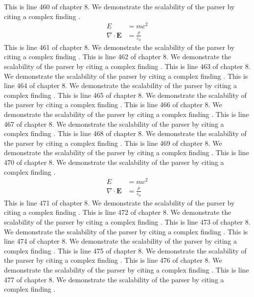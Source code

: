 This is line 460 of chapter 8. We demonstrate the scalability of the parser by citing a complex finding \cite{ref8_460}.
\begin{align*}
  E &= mc^2 \\
  \nabla \cdot \mathbf{E} &= \frac{\rho}{\varepsilon_0}
\end{align*}
This is line 461 of chapter 8. We demonstrate the scalability of the parser by citing a complex finding \cite{ref8_461}.
This is line 462 of chapter 8. We demonstrate the scalability of the parser by citing a complex finding \cite{ref8_462}.
This is line 463 of chapter 8. We demonstrate the scalability of the parser by citing a complex finding \cite{ref8_463}.
This is line 464 of chapter 8. We demonstrate the scalability of the parser by citing a complex finding \cite{ref8_464}.
This is line 465 of chapter 8. We demonstrate the scalability of the parser by citing a complex finding \cite{ref8_465}.
This is line 466 of chapter 8. We demonstrate the scalability of the parser by citing a complex finding \cite{ref8_466}.
This is line 467 of chapter 8. We demonstrate the scalability of the parser by citing a complex finding \cite{ref8_467}.
This is line 468 of chapter 8. We demonstrate the scalability of the parser by citing a complex finding \cite{ref8_468}.
This is line 469 of chapter 8. We demonstrate the scalability of the parser by citing a complex finding \cite{ref8_469}.
This is line 470 of chapter 8. We demonstrate the scalability of the parser by citing a complex finding \cite{ref8_470}.
\begin{align*}
  E &= mc^2 \\
  \nabla \cdot \mathbf{E} &= \frac{\rho}{\varepsilon_0}
\end{align*}
This is line 471 of chapter 8. We demonstrate the scalability of the parser by citing a complex finding \cite{ref8_471}.
This is line 472 of chapter 8. We demonstrate the scalability of the parser by citing a complex finding \cite{ref8_472}.
This is line 473 of chapter 8. We demonstrate the scalability of the parser by citing a complex finding \cite{ref8_473}.
This is line 474 of chapter 8. We demonstrate the scalability of the parser by citing a complex finding \cite{ref8_474}.
This is line 475 of chapter 8. We demonstrate the scalability of the parser by citing a complex finding \cite{ref8_475}.
This is line 476 of chapter 8. We demonstrate the scalability of the parser by citing a complex finding \cite{ref8_476}.
This is line 477 of chapter 8. We demonstrate the scalability of the parser by citing a complex finding \cite{ref8_477}.

